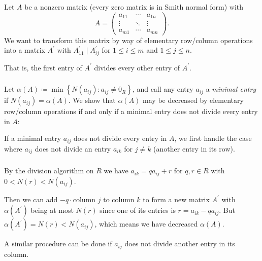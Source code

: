 \documentclass{beamer}
\newcommand{\cbr}[1]{\left\{#1\right\}}
\begin{document}
\begin{frame}
  \frametitle{}

  Let $A$ be a nonzero matrix (every zero matrix is in Smith normal form) with \[A = \begin{pmatrix}
    a_{11} &\cdots &a_{1n}\\
    \vdots &\ddots &\vdots\\
    a_{m1} &\cdots & a_{mn}
  \end{pmatrix}.\] We want to transform this matrix by way of elementary row/column operations into a matrix $A^{\prime}$ with $A^{\prime}_{11}\mid A^{\prime}_{ij}$ for $1\leq i\leq m$ and $1\leq j \leq n$.
  
  
  That is, the first entry of $A^{\prime}$ divides every other entry of $A^{\prime}$.

\end{frame}

\begin{frame}
  \frametitle{}

  Let $\alpha(A)\coloneqq\min\cbr{N(a_{ij})\colon a_{ij}\neq 0_R}$, and call any entry $a_{ij}$ a \textit{minimal entry} if $N(a_{ij}) = \alpha(A)$. We show that $\alpha(A)$ may be decreased by elementary row/column operations if and only if a minimal entry does not divide every entry in $A$:

  If a minimal entry $a_{ij}$ does not divide every entry in $A$, we first handle the case where $a_{ij}$ does not divide an entry $a_{ik}$ for $j\neq k$ (another entry in its row). 

\end{frame}

\begin{frame}
  \frametitle{}

  By the division algorithm on $R$ we have $a_{ik} = qa_{ij} + r$ for $q,r\in R$ with $0<N(r)<N(a_{ij})$.

  Then we can add $-q\cdot\text{column } j$ to column $k$ to form a new matrix $A^{\prime}$ with $\alpha(A^{\prime})$ being at most $N(r)$ since one of its entries is $r = a_{ik} - qa_{ij}$. But $\alpha(A^{\prime}) = N(r)<N(a_{ij})$, which means we have decreased $\alpha(A)$.

  A similar procedure can be done if $a_{ij}$ does not divide another entry in its column.

\end{frame}
\end{document}
